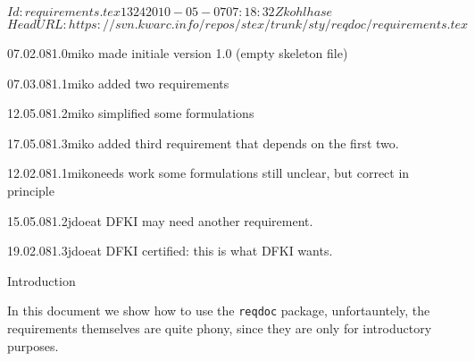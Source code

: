 \documentclass[twoside]{omdoc}
\begin{document}
\svnInfo $Id: requirements.tex 1324 2010-05-07 07:18:32Z kohlhase $
\svnKeyword $HeadURL: https://svn.kwarc.info/repos/stex/trunk/sty/reqdoc/requirements.tex $
\begin{DCmetadata}[maketitle] 
  \DCMdate{\today}
\end{DCmetadata}

\begin{VMchangelist}
  \begin{VMchange}{07.02.08}{1.0}{miko}
    made initiale version 1.0 (empty skeleton file)
  \end{VMchange}
  \begin{VMchange}{07.03.08}{1.1}{miko}
    added two requirements
  \end{VMchange}
  \begin{VMchange}{12.05.08}{1.2}{miko}
    simplified some formulations
  \end{VMchange}
  \begin{VMchange}{17.05.08}{1.3}{miko}
    added third requirement that depends on the first two.
  \end{VMchange}
\end{VMchangelist}

\begin{VMcertification}
  \begin{VMcertified}{12.02.08}{1.1}{miko}{needs work}
    some formulations still unclear, but correct in principle
  \end{VMcertified}
  \begin{VMcertified}{15.05.08}{1.2}{jdoe}{at DFKI}
    may need another requirement.
  \end{VMcertified}
  \begin{VMcertified}{19.02.08}{1.3}{jdoe}{at DFKI}
    certified: this is what DFKI wants. 
  \end{VMcertified}
\end{VMcertification}
\clearpage

\begin{omgroup}{Introduction} 
\begin{omtext}
In this document we show how to use the {\texttt{reqdoc}} package, unfortauntely, the
requirements themselves are quite phony, since they are only for introductory purposes.
\end{omtext}
\end{omgroup}
\end{document}
